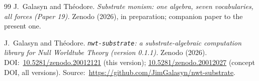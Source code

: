 \documentclass[11pt]{article}
\begin{document}
\begin{thebibliography}{99}
  J.~Galasyn and Th\'eodore.
  \emph{Substrate monism: one algebra, seven vocabularies,
  all forces (Paper 19).}
  Zenodo (2026), in preparation; companion paper to the present
  one.

  J.~Galasyn and Th\'eodore.
  \emph{\texttt{nwt-substrate}: a substrate-algebraic computation
  library for Null Worldtube Theory (version 0.1.1).}
  Zenodo (2026).
  DOI:~\href{https://doi.org/10.5281/zenodo.20012121}{10.5281/zenodo.20012121}
  (this version);
  \href{https://doi.org/10.5281/zenodo.20012027}{10.5281/zenodo.20012027}
  (concept DOI, all versions).
  Source:~\url{https://github.com/JimGalasyn/nwt-substrate}.

\end{thebibliography}
\end{document}
